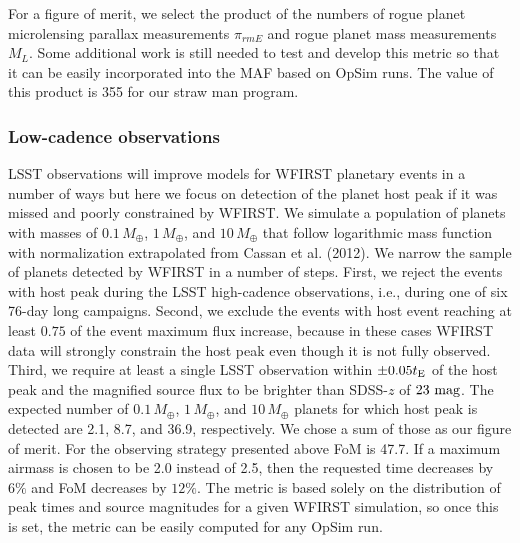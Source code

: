For a figure of merit, we select the product of the numbers of
rogue planet microlensing parallax measurements $\pi_{rm E}$
and rogue planet mass measurements $M_L$. Some additional 
work is still needed to test and develop this metric so that it can be easily incorporated into the MAF based on OpSim runs.
The value of this product is 355 for our straw man program.


\subsubsection{Low-cadence observations}

LSST observations will improve models for WFIRST planetary events 
in a number of ways but here we focus on detection of the planet 
host peak if it was missed and poorly constrained by WFIRST. We simulate 
a population of planets with masses of $0.1\,M_\oplus$, $1\,M_\oplus$, 
and $10\,M_\oplus$ that follow logarithmic mass function with 
normalization extrapolated from Cassan et al. (2012). We narrow the sample of 
planets detected by WFIRST in a number of steps. First, we reject the events 
with host peak during the LSST high-cadence observations, i.e., during one of six 
76-day long campaigns. Second, we exclude the events with host event reaching 
at least $0.75$ of the event maximum flux increase, because in these cases WFIRST 
data will strongly constrain the host peak even though it is not fully observed. 
Third, we require at least a single LSST observation within $\pm0.05t_{\rm E}$ of 
the host peak and the magnified source flux to be brighter than SDSS-$z$ of $23~{\rm mag}$. 
The expected number of $0.1\,M_\oplus$, $1\,M_\oplus$, and $10\,M_\oplus$ 
planets for which host peak is detected are 2.1, 8.7, and 36.9, respectively. 
We chose a sum of those as our figure of merit. For the observing strategy 
presented above FoM is 47.7. If a maximum airmass is chosen to be 
2.0 instead of 2.5, then the requested time decreases by $6\%$ and FoM decreases by $12\%$. 
The metric is based solely on the distribution of peak times and source magnitudes 
for a given WFIRST simulation, so once this is set, the metric can 
be easily computed for any OpSim run.



%
%
%
%


